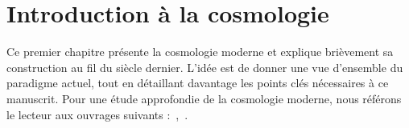 % 


% 




% 


\graphicspath{ {../figures/intro/} }

\chapter{Introduction à la cosmologie}
\minitoc
\newpage
\thispagestyle{fancy}

  Ce premier chapitre présente la cosmologie moderne et explique brièvement sa construction au fil du siècle dernier. L'idée est de donner une vue d'ensemble du paradigme actuel, tout en détaillant davantage les points clés nécessaires à ce manuscrit. Pour une étude approfondie de la cosmologie moderne, nous référons le lecteur aux ouvrages suivants :~\textcite{Rich2010},~\textcite{Dodelson2003}.

